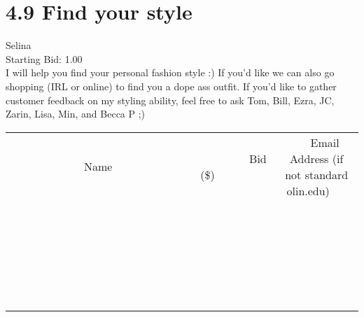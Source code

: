 \documentclass[11pt]{article}
\begin{document}
					\section*{4.9 Find your style}
					Selina \\
					Starting Bid: 1.00 \\
					I will help you find your personal fashion style :) If you'd like we can also go shopping (IRL or online) to find you a dope ass outfit. If you'd like to gather customer feedback on my styling ability, feel free to ask Tom, Bill, Ezra, JC, Zarin, Lisa, Min, and Becca P ;) \\
					[6ex]
					\begin{tabular}{c c c}
						~~~~~~~~~~~~~Name~~~~~~~~~~~~~ & ~~~~~~~~~Bid (\$)~~~~~~~~~ & ~~~Email Address (if not standard olin.edu)~~~ \\
				
 & & \\
\hline
 & & \\
\hline
 & & \\
\hline
 & & \\
\hline
 & & \\
\hline
 & & \\
\hline
 & & \\
\hline
 & & \\
\hline
 & & \\
\hline
 & & \\
\hline
 & & \\
\hline
 & & \\
\hline
 & & \\
\hline
 & & \\
\hline
 & & \\
\hline
 & & \\
\hline
 & & \\
\hline
 & & \\
\hline
 & & \\
\hline
 & & \\
\hline
 & & \\
\hline
 & & \\
\hline
 & & \\
\hline
 & & \\
\hline
 & & \\
\hline
 & & \\
\hline
					\end{tabular}
					\clearpage
				
\end{document}

